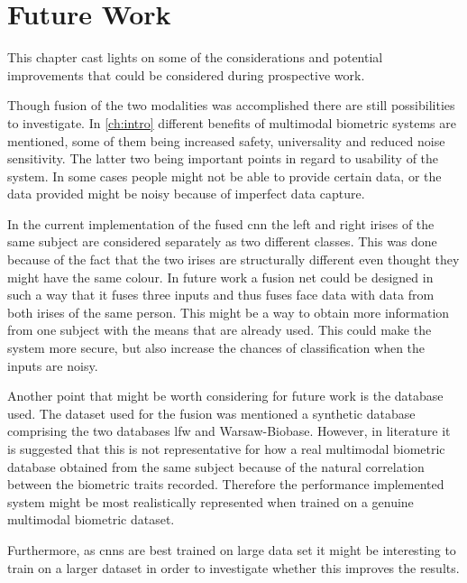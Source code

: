 \chapter{Future Work}
\label{ch:future_work}
This chapter cast lights on some of the considerations and potential improvements that could be considered during prospective work. 

Though fusion of the two modalities was accomplished there are still possibilities to investigate. 
In \autoref{ch:intro} different benefits of multimodal biometric systems are mentioned, some of them being increased safety, universality and reduced noise sensitivity. The latter two being important points in regard to usability of the system. In some cases people might not be able to provide certain data, or the data provided might be noisy because of imperfect data capture. 

In the current implementation of the fused \gls{cnn} the left and right irises of the same subject are considered separately as two different classes. This was done because of the fact that the two irises are structurally different even thought they might have the same colour. In future work a fusion net could be designed in such a way that it fuses three inputs and thus fuses face data with data from both irises of the same person. This might be a way to obtain more information from one subject with the means that are already used. This could make the system more secure, but also increase the chances of classification when the inputs are noisy. 

Another point that might be worth considering for future work is the database used. The dataset used for the fusion was mentioned a synthetic database comprising the two databases \gls{lfw} and Warsaw-Biobase.  However, in literature it is suggested that this is not representative for how a real multimodal biometric database obtained from the same subject because of the natural correlation between the biometric traits recorded. Therefore the performance implemented system might be most realistically represented when trained on a genuine multimodal biometric dataset. 

Furthermore, as \gls{cnn}s are best trained on large data set it might be interesting to train on a larger dataset in order to investigate whether this improves the results. 


